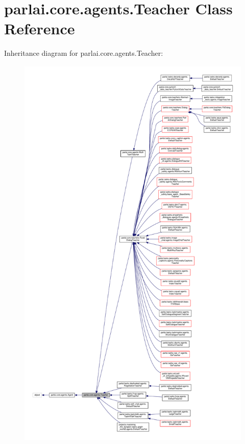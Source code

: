 \hypertarget{classparlai_1_1core_1_1agents_1_1Teacher}{}\section{parlai.\+core.\+agents.\+Teacher Class Reference}
\label{classparlai_1_1core_1_1agents_1_1Teacher}


Inheritance diagram for parlai.\+core.\+agents.\+Teacher\+:
\nopagebreak
\begin{figure}[H]
\begin{center}
\leavevmode
\includegraphics[height=550pt]{classparlai_1_1core_1_1agents_1_1Teacher__inherit__graph}
\end{center}
\end{figure}


